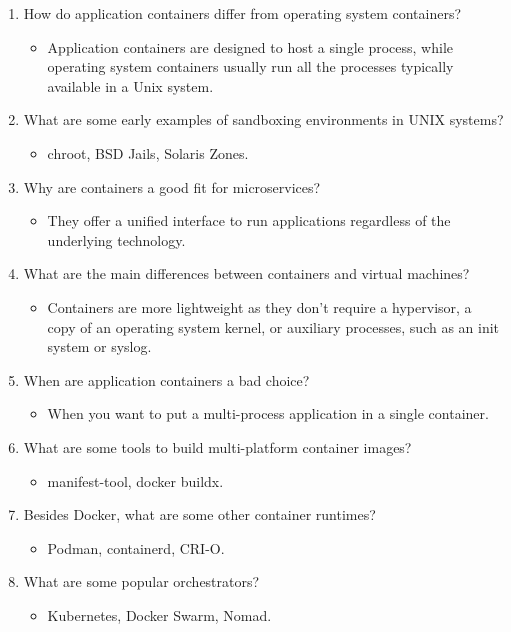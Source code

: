 \begin{enumerate}
\item
How do application containers differ from operating system containers?
\begin{itemize}
\item 
Application containers are designed to host a single process, while operating system containers usually run all the processes typically available in a Unix system.
\end{itemize}

\item
What are some early examples of sandboxing environments in UNIX systems?
\begin{itemize}
\item 
chroot, BSD Jails, Solaris Zones.
\end{itemize}

\item
Why are containers a good fit for microservices?
\begin{itemize}
\item 
They offer a unified interface to run applications regardless of the underlying technology.
\end{itemize}

\item
What are the main differences between containers and virtual machines?
\begin{itemize}
\item 
Containers are more lightweight as they don't require a hypervisor, a copy of an operating system kernel, or auxiliary processes, such as an init system or syslog.
\end{itemize}

\item
When are application containers a bad choice?
\begin{itemize}
\item 
When you want to put a multi-process application in a single container.
\end{itemize}

\item
What are some tools to build multi-platform container images?
\begin{itemize}
\item 
manifest-tool, docker buildx.
\end{itemize}

\item
Besides Docker, what are some other container runtimes?
\begin{itemize}
\item 
Podman, containerd, CRI-O.
\end{itemize}

\item
What are some popular orchestrators?
\begin{itemize}
\item 
Kubernetes, Docker Swarm, Nomad.
\end{itemize}
\end{enumerate}